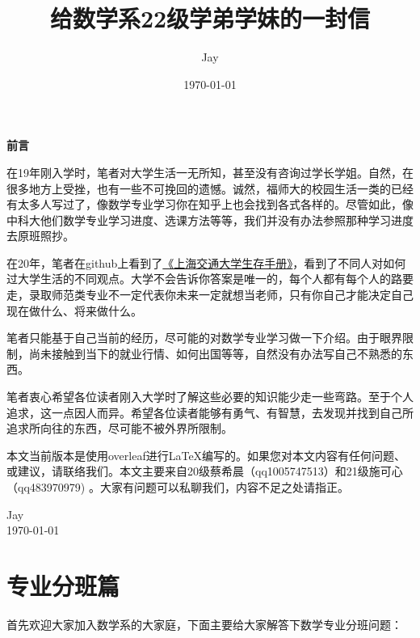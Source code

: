 \documentclass{my_paper}
\title{给数学系22级学弟学妹的一封信}
\author{Jay }
\date{\today}
\begin{document}
\maketitle
\thispagestyle{empty}

\newpage

\begin{center}
	\textbf{\LARGE 前言}
\end{center}

在19年刚入学时，笔者对大学生活一无所知，甚至没有咨询过学长学姐。自然，在很多地方上受挫，也有一些不可挽回的遗憾。诚然，福师大的校园生活一类的已经有太多人写过了，像数学专业学习你在知乎上也会找到各式各样的。尽管如此，像中科大他们数学专业学习进度、选课方法等等，我们并没有办法参照那种学习进度去原班照抄。

在20年，笔者在github上看到了\href{https://survivesjtu.gitbook.io/survivesjtumanual/}{《上海交通大学生存手册》}，看到了不同人对如何过大学生活的不同观点。大学不会告诉你答案是唯一的，每个人都有每个人的路要走，录取师范类专业不一定代表你未来一定就想当老师，只有你自己才能决定自己现在做什么、将来做什么。

笔者只能基于自己当前的经历，尽可能的对数学专业学习做一下介绍。由于眼界限制，尚未接触到当下的就业行情、如何出国等等，自然没有办法写自己不熟悉的东西。

笔者衷心希望各位读者刚入大学时了解这些必要的知识能少走一些弯路。至于个人追求，这一点因人而异。希望各位读者能够有勇气、有智慧，去发现并找到自己所追求所向往的东西，尽可能不被外界所限制。

本文当前版本是使用overleaf进行\LaTeX{}编写的。如果您对本文内容有任何问题、或建议，请联络我们。本文主要来自20级蔡希晨（qq1005747513）和21级施可心（qq483970979) 。大家有问题可以私聊我们，内容不足之处请指正。

\begin{flushright}
	Jay \\
	\today
\end{flushright}




\newpage


\tableofcontents

\thispagestyle{empty}
\newpage

\setcounter{page}{1}
\section{专业分班篇}

首先欢迎大家加入数学系的大家庭，下面主要给大家解答下数学专业分班问题：
\end{document}
